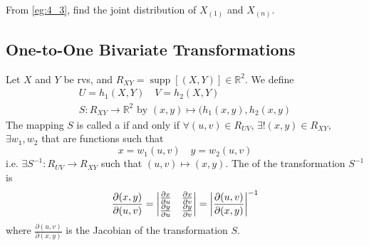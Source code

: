 \documentclass[notoc,notitlepage]{tufte-book}
\DeclareMathOperator{\supp}{supp }
\begin{document}
\begin{ex}
  From \cref{eg:4_3}, find the joint distribution of $X_{(1)}$ and $X_{(n)}$.
\end{ex}


\subsection{One-to-One Bivariate Transformations}%
\label{sub:one_to_one_bivariate_transformations}

\begin{defn}
\label{defn:one_to_one_bivariate_transformation}
Let $X$ and $Y$ be rvs, and $R_{XY} = \supp[(X, Y)] \in \mathbb{R}^2$. We define
  \begin{gather*}
    U = h_1(X, Y) \quad V = h_2(X, Y) \\
    S : R_{XY} \to \mathbb{R}^2 \text{ by } (x, y) \mapsto ( h_1(x, y), h_2(x, y )
  \end{gather*}
  The mapping $S$ is called a  if and only if  $\forall (u, v) \in R_{UV}$, $\exists! (x, y) \in R_{XY}$, $\exists w_1, w_2$ that are functions such that
  \begin{equation*}
    x = w_1(u, v) \quad y = w_2(u, v)
  \end{equation*}
  i.e. $\exists S^{-1} : R_{UV} \to R_{XY}$ such that $(u, v) \mapsto (x, y)$. The  of the transformation $S^{-1}$ is
  \begin{equation*}
    \frac{\partial(x, y)}{\partial (u, v)} = \begin{vmatrix}
      \frac{\partial x}{\partial u} & \frac{\partial x}{\partial v} \\
      \frac{\partial y}{\partial u} & \frac{\partial y}{\partial v}
    \end{vmatrix} = \left| \frac{\partial (u, v)}{\partial (x, y)} \right|^{-1}
  \end{equation*}
  where $\frac{\partial (u, v)}{\partial (x, y)}$ is the Jacobian of the transformation $S$.
\end{defn}
\end{document}
